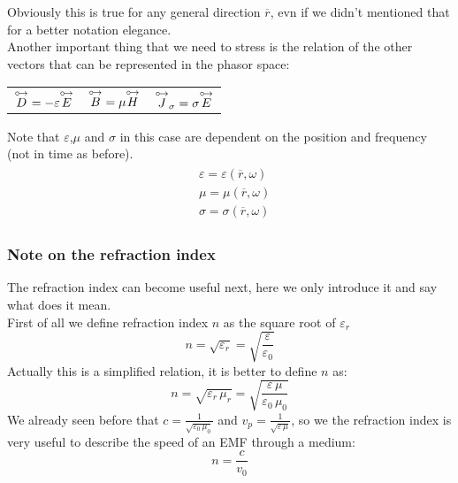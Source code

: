 Obviously this is true for any general direction $\overline{r}$, evn if we didn't mentioned that for a better notation elegance.\\
Another important thing that we need to stress is the relation of the other vectors that can be represented in the phasor space:
\begin{center}
    \begin{tabular}{ c c c }
        $\overset{\mathbin {{\circ \mkern-2.5mu\rightarrow}}}{D}=-\varepsilon \overset{\mathbin {{\circ \mkern-2.5mu\rightarrow}}}{E}$&
        $\overset{\mathbin {{\circ \mkern-2.5mu\rightarrow}}}{B}=\mu \overset{\mathbin {{\circ \mkern-2.5mu\rightarrow}}}{H}$&
        $\overset{\mathbin {{\circ \mkern-2.5mu\rightarrow}}}{J}_\sigma=\sigma\overset{\mathbin {{\circ \mkern-2.5mu\rightarrow}}}{E}$
    \end{tabular}
\end{center}
Note that $\varepsilon$,$\mu$ and $\sigma$ in this case are dependent on the position and frequency (not in time as before).
\begin{align}
    \begin{split}
        &\varepsilon=\varepsilon(\overline{r},\omega)\\[5pt]
        &\mu=\mu(\overline{r},\omega)\\[5pt]
        &\sigma=\sigma(\overline{r},\omega)
    \end{split}
\end{align}
\subsubsection*{Note on the refraction index}
The refraction index can become useful next, here we only introduce it and say what does it mean.\\
First of all we define refraction index $n$ as the square root of $\varepsilon_r$
\begin{equation}
    n=\sqrt{\varepsilon_r}=\sqrt{\frac{\varepsilon}{\varepsilon_0}}
\end{equation}
Actually this is a simplified relation, it is better to define $n$ as:
\begin{equation}
    n=\sqrt{\varepsilon_r\,\mu_r}=\sqrt{\frac{\varepsilon\,\mu}{\varepsilon_0\,\mu_0}}
\end{equation}
We already seen before that $c=\frac{1}{\sqrt{\varepsilon_0\,\mu_0}}$ and $v_p=\frac{1}{\sqrt{\varepsilon\,\mu }}$, so we the refraction index is very useful to describe the speed of an EMF through a medium:
\begin{equation}
    n=\frac{c}{v_0}
\end{equation}
